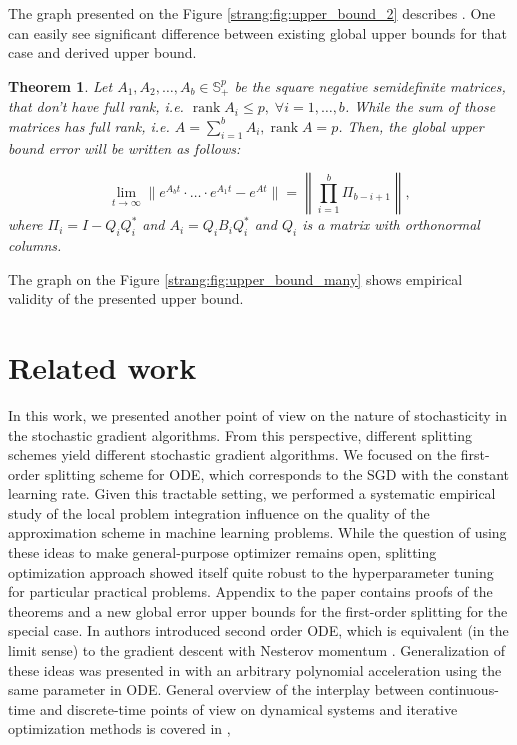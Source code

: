 \documentclass{article}
\newtheorem{theorem}{Theorem}
\begin{document}
The graph presented on the Figure \ref{strang:fig:upper_bound_2} describes . One can easily see significant difference between existing global upper bounds for that case \citet{sheng1994global} and derived upper bound.

\begin{theorem}\label{strang:theorem_uppbound}
    Let $A_1, A_2, \ldots, A_b \in \mathbb{S}^p_{+}$ be the square negative semidefinite matrices, that don't have full rank, i.e. $\operatorname{rank}{A_i} \leq p, \;\forall i = 1, \ldots, b$. While the sum of those matrices has full rank, i.e. $A = \sum\limits_{i=1}^b A_i, \operatorname{rank}{A} = p$. Then, the global upper bound error will be written as follows:

    \begin{equation}\label{strang:global_error_upper_bound}
        \lim_{t \to \infty}\| e^{A_bt} \cdot \ldots \cdot e^{A_1t} - e^{At}\| = \left\|\prod\limits_{i=1}^b \Pi_{b-i+1}\right\|,
    \end{equation}
    where $\Pi_i = I - Q_iQ_i^*$ and $A_i = Q_iB_iQ_i^*$ and $Q_i$ is a matrix with orthonormal columns. 
\end{theorem}

The graph on the Figure \ref{strang:fig:upper_bound_many} shows empirical validity of the presented upper bound.




\section{Related work}
In this work, we presented another point of view on the nature of stochasticity in the stochastic gradient algorithms. From this perspective, different splitting schemes yield different stochastic gradient algorithms. We focused on the first-order splitting scheme for ODE, which corresponds to the SGD with the constant learning rate. Given this tractable setting, we performed a systematic empirical study of the local problem integration influence on the quality of the approximation scheme in machine learning problems. While the question of using these ideas to make general-purpose optimizer remains open, splitting optimization approach showed itself quite robust to the hyperparameter tuning for particular practical problems. Appendix to the paper contains proofs of the theorems and a new global error upper bounds for the first-order splitting for the special case.
In \citet{su2014differential}  authors introduced second order ODE, which is equivalent (in the limit sense) to the gradient descent with Nesterov momentum \citet{nesterov1983method}.  Generalization of these ideas was presented in \citet{wibisono2016variational} with an arbitrary polynomial acceleration using the same parameter in ODE. General overview of the interplay between continuous-time and discrete-time points of view on dynamical systems and iterative optimization methods is covered in \citet{helmke2012optimization}, \citet{evtushenko1994stable}
\end{document}
